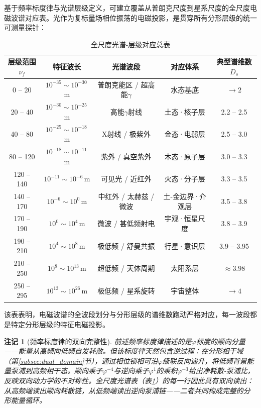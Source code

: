 \documentclass[12pt,a4paper,twocolumn]{article}
\renewcommand{\phi}{\varphi}
\newtheorem{remark}[theorem]{注记}
\begin{document}
基于频率标度律与光谱层级定义，可建立覆盖从普朗克尺度到星系尺度的全尺度电磁波谱对应表。光作为复标量场相位振荡的电磁投影，是贯穿所有分形层级的统一可测量探针：

\begin{table}[H]
\centering
\footnotesize
\caption{全尺度光谱-层级对应总表}
\label{tab:spectral_layer_overview}
\begin{tabular}{c|c|c|c|c}
\hline
\textbf{层级范围$\nu_f$} & \textbf{特征波长} & \textbf{光谱波段} & \textbf{对应体系} & \textbf{典型谱维数$D_s$} \\
\hline
0 -- 20 & $10^{-35} \sim 10^{-30}$\,m & 普朗克能区 / 超高能$\gamma$ & 水态基底 & $\to 2$ \\
20 -- 40 & $10^{-30} \sim 10^{-25}$\,m & 高能$\gamma$射线 & 土态·核子层 & 2.2 -- 2.5 \\
40 -- 80 & $10^{-25} \sim 10^{-18}$\,m & X射线 / 极紫外 & 金态·电弱层 & 2.5 -- 3.0 \\
80 -- 120 & $10^{-18} \sim 10^{-11}$\,m & 紫外 / 真空紫外 & 木态·原子层 & 3.0 -- 3.3 \\
120 -- 140 & $10^{-11} \sim 10^{-6}$\,m & 可见光 / 近红外 & 火态·分子层 & 3.3 -- 3.5 \\
140 -- 170 & $10^{-6} \sim 10^{0}$\,m & 中红外 / 太赫兹 / 微波 & 土-金边界·介观层 & 3.5 -- 3.8 \\
170 -- 190 & $10^{0} \sim 10^{4}$\,m & 微波 / 甚低频射电 & 宇观·恒星尺度 & 3.8 -- 3.9 \\
190 -- 210 & $10^{4} \sim 10^{8}$\,m & 极低频 / 舒曼共振 & 行星·意识层 & 3.9 -- 3.95 \\
210 -- 250 & $10^{8} \sim 10^{13}$\,m & 超低频 / 天体周期 & 太阳系层 & $\approx 3.98$ \\
250 -- 295 & $10^{13} \sim 10^{26}$\,m & 极低频 / 星系旋转 & 宇宙整体 & $\to 4$ \\
\hline
\end{tabular}
\end{table}

该表表明，电磁波谱的全波段划分与分形层级的谱维数跑动严格对应，每一波段都是特定分形层级的特征电磁投影。

\begin{remark}[频率标度律的双向完整性]
\label{rmk:frequency_scaling_bidirectional}
前述频率标度律描述的是$\phi$标度的\emph{顺向}分量——能量从高频向低频自发耗散。但该标度律天然包含逆过程：在分形相干域（第\ref{subsec:dual_domain}节），通过相位锁相可沿$\phi$级联反向递升，将低频背景能量泵浦到高频相干态。顺向乘子$\phi^{-4}$与逆向乘子$\phi^{1}$的乘积$\phi^{-3}$给出净耗散-泵浦比，反映双向动力学的不对称性。全尺度光谱表（表\ref{tab:spectral_layer_overview}）的每一行因此具有双向读出：从高频端读出顺向耗散链，从低频端读出逆向泵浦链——二者共同构成完整的分形能量循环。
\end{remark}
\end{document}
